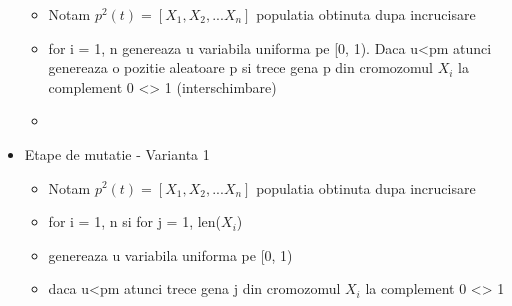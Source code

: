 \documentclass[a4paper]{article}
\begin{document}
\begin{multicols}{2}
\begin{itemize}
    \begin{itemize}
    \item Notam $p^2(t) = [X_1, X_2,...X_n]$ populatia obtinuta dupa incrucisare
    \item for i = 1, n genereaza u variabila uniforma pe [0, 1). Daca u<pm atunci genereaza o pozitie aleatoare p si trece gena p din cromozomul $X_i$ la complement 0 <> 1 (interschimbare)
    \item 
    \end{itemize}
    \item Etape de mutatie - Varianta 1
    \begin{itemize}
    \item Notam $p^2(t) = [X_1, X_2,...X_n]$ populatia obtinuta dupa incrucisare
    \item for i = 1, n si for j = 1, len($X_i$)
    \item genereaza u variabila uniforma pe [0, 1)
    \item daca u<pm atunci trece gena j din cromozomul $X_i$ la complement 0 <> 1
    \end{itemize}
\end{itemize}
\end{multicols}
\end{document}
